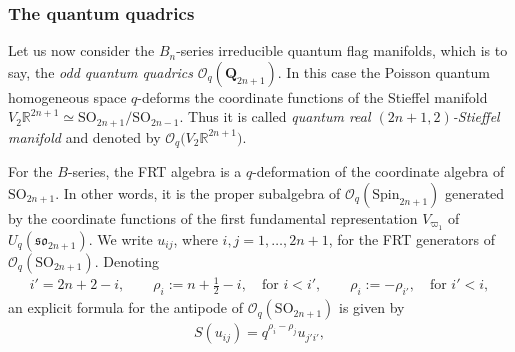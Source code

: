 \documentclass[pdftex]{sigma}
\numberwithin{equation}{section}
\begin{document}
\subsubsection{The quantum quadrics}

Let us now consider the $B_n$-series irreducible quantum flag manifolds, which is to say, the \emph{odd quantum quadrics} $\mathcal{O}_q(\mathbf{Q}_{2n+1})$. In this case the Poisson quantum homogeneous space $q$-deforms the coordinate functions of the Stieffel manifold $V_2\mathbb{R}^{2n+1} \simeq \mathrm{SO}_{2n+1}/\mathrm{SO}_{2n-1}$. Thus it is called \emph{quantum real $(2n+1,2)$-Stieffel manifold} and denoted by $\mathcal{O}_q\big(V_2\mathbb{R}^{2n+1}\big)$.

For the $B$-series, the FRT algebra is a $q$-deformation of the coordinate algebra of $\mathrm{SO}_{2n+1}$. In other words, it is the proper subalgebra of $\mathcal{O}_q(\mathrm{Spin}_{2n+1})$ generated by the coordinate functions of the first fundamental representation $V_{\varpi_1}$ of $U_q(\mathfrak{so}_{2n+1})$. We write $u_{ij}$, where $i,j = 1, \dots, 2n+1$, for the FRT generators of $\mathcal{O}_q(\mathrm{SO}_{2n+1})$. Denoting
\begin{gather*}
i' = 2n+2-i, \qquad \rho_i := n + \frac{1}{2} -i, \quad \textrm{for } i < i', \qquad \rho_{i} := -\rho_{i'}, \quad \textrm{for } i' < i,
\end{gather*}
an explicit formula for the antipode of $\mathcal{O}_q(\mathrm{SO}_{2n+1})$ is given by
\begin{gather*}
S(u_{ij}) = q^{\rho_i - \rho_j} u_{j'i'},
\end{gather*}
\end{document}
